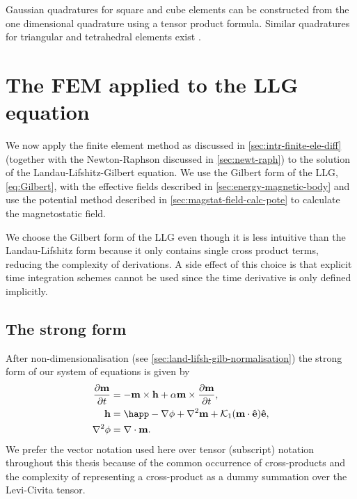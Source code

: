 Gaussian quadratures for square and cube elements can be constructed from the one dimensional quadrature using a tensor product formula.
Similar quadratures for triangular and tetrahedral elements exist \eg \cite{Dunavant1985} \cite{Rathod2006}.




\section{The FEM applied to the LLG equation}
\label{sec:llg-initial-equations}

We now apply the finite element method as discussed in \cref{sec:intr-finite-ele-diff} (together with the Newton-Raphson discussed in \cref{sec:newt-raph}) to the solution of the Landau-Lifshitz-Gilbert equation.
We use the Gilbert form of the LLG, \cref{eq:Gilbert}, with the effective fields described in \cref{sec:energy-magnetic-body} and use the potential method described in \cref{sec:magstat-field-calc-pote} to calculate the magnetostatic field.

We choose the Gilbert form of the LLG even though it is less intuitive than the Landau-Lifshitz form because it only contains single cross product terms, reducing the complexity of derivations.
A side effect of this choice is that explicit time integration schemes cannot be used since the time derivative is only defined implicitly.

\subsection{The strong form}

After non-dimensionalisation (see \cref{sec:land-lifsh-gilb-normalisation}) the strong form of our system of equations is given by
\begin{equation}
  \begin{aligned}
    \dmdt &= - \mv \times \hv + \dampc \mv \times \dmdt, \\
    \hv &= \happ - \grad \phim + \lap \mv + \kone (\mv \cdot \ev) \ev, \\
    \lap \phim &= \div \mv.
    \label{eqn:ndllg-starting}
  \end{aligned}
\end{equation}
We prefer the vector notation used here over tensor (\ie subscript) notation throughout this thesis because of the common occurrence of cross-products and the complexity of representing a cross-product as a dummy summation over the Levi-Civita tensor.


